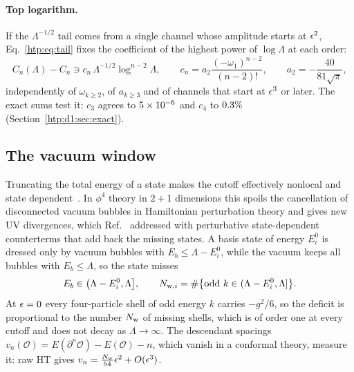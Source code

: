 \paragraph{Top logarithm.} If the $\Lambda^{-1/2}$ tail comes from a single channel whose amplitude starts at $\epsilon^2$,
Eq.~\eqref{htp:eq:tail} fixes the coefficient of the highest power of $\log\Lambda$ at each order:
\begin{equation}
 C_n(\Lambda)-C_n\ni c_n\,\Lambda^{-1/2}\log^{n-2}\Lambda,\qquad
 c_n=a_2\frac{(-\omega_1)^{n-2}}{(n-2)!},\qquad a_2=-\frac{40}{81\sqrt\pi},
 \label{htp:eq:toplog}
\end{equation}
independently of $\omega_{k\ge2}$, of $a_{k\ge3}$ and of channels that start at $\epsilon^3$ or later. The exact sums test it:
$c_3$ agrees to $5\times10^{-6}$ and $c_4$ to $0.3\%$ (Section~\ref{htp:d1:sec:exact}).

\subsection{The vacuum window}\label{htp:sec:window}
Truncating the total energy of a state makes the cutoff effectively nonlocal and state dependent~\cite{htp:Rychkov:2014eea}.
In $\phi^4$ theory in $2+1$ dimensions this spoils the cancellation of disconnected vacuum bubbles in Hamiltonian
perturbation theory and gives new UV divergences, which Ref.~\cite{htp:Elias-Miro:2020qwz} addressed with perturbative
state-dependent counterterms that add back the missing states.
A basis state of energy $E^0_i$ is dressed only by vacuum bubbles with $E_b\le\Lambda-E^0_i$, while the vacuum keeps all
bubbles with $E_b\le\Lambda$, so the state misses
\begin{equation}
 E_b\in\big(\Lambda-E^0_i,\Lambda\big],\qquad N_{{\rm w},i}=\#\big\{\text{odd }k\in(\Lambda-E^0_i,\Lambda]\big\}.
 \label{htp:eq:window}
\end{equation}
At $\epsilon=0$ every four-particle shell of odd energy $k$ carries $-g^2/6$, so the deficit is proportional to the number
$N_{\rm w}$ of missing shells, which is of order one at every cutoff and does not decay as $\Lambda\to\infty$. The
descendant spacings $v_n(\mathcal O)=E(\partial^n\mathcal O)-E(\mathcal O)-n$, which vanish in a conformal theory,
measure it: raw HT gives $v_n=\tfrac{N_{\rm w}}{54}\epsilon^2+O(\epsilon^3)$.

